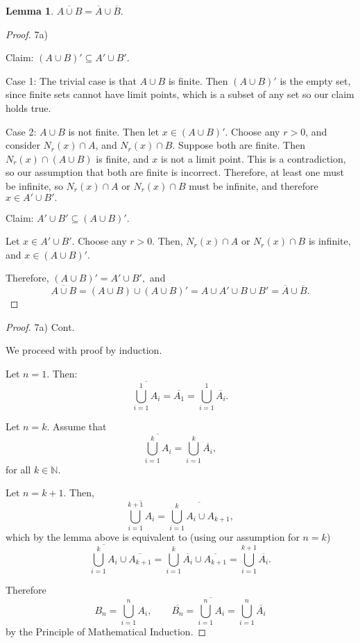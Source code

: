 \documentclass[10pt]{article}
\theoremstyle{definition}
\theoremstyle{plain}
\newtheorem*{lemma*}{Lemma}
\newcommand{\N}{\mathbb{N}}
\begin{document}
\begin{lemma*}
$\overline{A\cup B} = \overline{A}\cup\overline{B}.$
\end{lemma*}

\begin{proof}
7a)

Claim: $(A\cup B)' \subseteq A' \cup B'.$

Case 1: The trivial case is that $A\cup B$ is finite. Then $(A\cup B)'$ is the empty set, since finite sets cannot have limit points, which is a subset of any set so our claim holds true.

Case 2: $A\cup B$ is not finite. Then let $x\in(A\cup B)'$. Choose any $r>0$, and consider $N_r (x) \cap A$, and $N_r (x) \cap B$. Suppose both are finite. Then $N_r (x) \cap (A\cup B)$ is finite, and $x$ is not a limit point. This is a contradiction, so our assumption that both are finite is incorrect. Therefore, at least one must be infinite, so $N_r (x) \cap A$ or $N_r (x) \cap B$ must be infinite, and therefore $x\in A'\cup B'.$

Claim: $A' \cup B' \subseteq (A\cup B)'.$

Let $x\in A'\cup B'.$ Choose any $r>0$. Then, $N_r (x) \cap A$ or $N_r (x) \cap B$  is infinite, and $x\in(A\cup B)'$.

Therefore, $(A\cup B)' = A' \cup B',$ and
$$\overline{A\cup B} = (A\cup B)\cup(A\cup B)' = A\cup A' \cup B \cup B' = \overline{A}\cup\overline{B}.$$
\end{proof}

\begin{proof}
7a) Cont.

We proceed with proof by induction.

Let $n = 1.$ Then:
$$\overline{\bigcup^1_{i=1} A_i} = \overline{A_1}=\bigcup^1_{i=1} \overline{A_i}.$$

Let $n=k$. Assume that
$$\overline{\bigcup^k_{i=1} A_i} = \bigcup^k_{i=1} \overline{A_i},$$ for all $k\in\N$.

Let $n=k+1$. Then,
$$\overline{\bigcup^{k+1}_{i=1} A_i} = \overline{\bigcup^k_{i=1} A_i \cup A_{k+1}},$$
which by the lemma above is equivalent to (using our assumption for $n=k$)
$$\overline{\bigcup^k_{i=1} A_i} \cup \overline{A_{k+1}} = \bigcup^k_{i=1} \overline{A_i} \cup \overline{A_{k+1}} = \bigcup^{k+1}_{i=1} \overline{A_i}.$$

Therefore
$$B_n = \bigcup^n_{i=1} A_i, \qquad \overline{B_n} = \overline{\bigcup^n_{i=1} A_i} = \bigcup^n_{i=1} \overline{A_i}$$
by the Principle of Mathematical Induction.
\end{proof}
\end{document}
